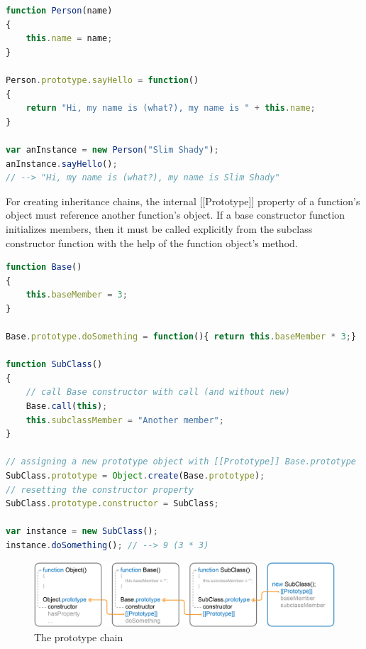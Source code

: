 \SingleSpacing
\begin{lstlisting}[language=JavaScript, caption=Classes in \myProperName{JavaScript}, label=JSClasses]
function Person(name)
{
	this.name = name;
}

Person.prototype.sayHello = function()
{
	return "Hi, my name is (what?), my name is " + this.name;
}

var anInstance = new Person("Slim Shady");
anInstance.sayHello();
// --> "Hi, my name is (what?), my name is Slim Shady"
\end{lstlisting}
\OnehalfSpacing

For creating inheritance chains, the internal [[Prototype]] property of a function's \linebreak{} object must reference another function's  object. If a base \linebreak constructor function initializes members, then it must be called explicitly from the subclass constructor function with the help of the function object's  method.

\SingleSpacing
\begin{lstlisting}[language=JavaScript, caption=Prototype-based inheritance in \myProperName{JavaScript}, label=lst:PrototypeInheritance]
function Base()
{
	this.baseMember = 3;
}

Base.prototype.doSomething = function(){ return this.baseMember * 3;}

function SubClass()
{
	// call Base constructor with call (and without new)
	Base.call(this);
	this.subclassMember = "Another member";
}

// assigning a new prototype object with [[Prototype]] Base.prototype
SubClass.prototype = Object.create(Base.prototype);
// resetting the constructor property
SubClass.prototype.constructor = SubClass;

var instance = new SubClass();
instance.doSomething(); // --> 9 (3 * 3)

\end{lstlisting}
\OnehalfSpacing

\vspace{10pt}
\begin{figure}[h] %
	\centering
		\includegraphics[scale=0.32]{Images/PrototypeChain.png}
	\caption{The prototype chain}
	\label{fig:PrototypeChain}
\end{figure}

